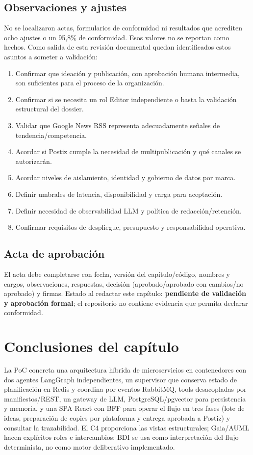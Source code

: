 \documentclass[12pt,oneside]{report}
\begin{document}
\subsection{Observaciones y ajustes}
No se localizaron actas, formularios de conformidad ni resultados que acrediten ocho ajustes o un 95,8\% de conformidad. Esos valores no se reportan como hechos. Como salida de esta revisión documental quedan identificados estos asuntos a someter a validación:
\begin{enumerate}
  \item Confirmar que ideación y publicación, con aprobación humana intermedia, son suficientes para el proceso de la organización.
  \item Confirmar si se necesita un rol Editor independiente o basta la validación estructural del dossier.
  \item Validar que Google News RSS representa adecuadamente señales de tendencia/competencia.
  \item Acordar si Postiz cumple la necesidad de multipublicación y qué canales se autorizarán.
  \item Acordar niveles de aislamiento, identidad y gobierno de datos por marca.
  \item Definir umbrales de latencia, disponibilidad y carga para aceptación.
  \item Definir necesidad de observabilidad LLM y política de redacción/retención.
  \item Confirmar requisitos de despliegue, presupuesto y responsabilidad operativa.
\end{enumerate}

\subsection{Acta de aprobación}
El acta debe completarse con fecha, versión del capítulo/código, nombres y cargos, observaciones, respuestas, decisión (aprobado/aprobado con cambios/no aprobado) y firmas. Estado al redactar este capítulo: \textbf{pendiente de validación y aprobación formal}; el repositorio no contiene evidencia que permita declarar conformidad.

\section{Conclusiones del capítulo}
La PoC concreta una arquitectura híbrida de microservicios en contenedores con dos agentes LangGraph independientes, un supervisor que conserva estado de planificación en Redis y coordina por eventos RabbitMQ, tools desacopladas por manifiestos/REST, un gateway de LLM, PostgreSQL/pgvector para persistencia y memoria, y una SPA React con BFF para operar el flujo en tres fases (lote de ideas, preparación de copies por plataforma y entrega aprobada a Postiz) y consultar la trazabilidad. El C4 proporciona las vistas estructurales; Gaia/AUML hacen explícitos roles e intercambios; BDI se usa como interpretación del flujo determinista, no como motor deliberativo implementado.
\end{document}
